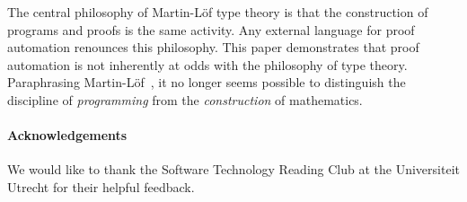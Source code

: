\documentclass[preprint]{sigplanconf}
\begin{document}
The central philosophy of Martin-L\"of type theory is that the
construction of programs and proofs is the same activity. Any
external language for proof automation renounces this philosophy. This
paper demonstrates that proof automation is not inherently at odds
with the philosophy of type theory. Paraphrasing
Martin-L\"of~\cite{martin-lof}, it no longer seems possible to
distinguish the discipline of \emph{programming} from the
\emph{construction} of mathematics.





\paragraph{Acknowledgements}
We would like to thank the Software Technology Reading Club at the
Universiteit Utrecht for their helpful feedback.




\end{document}
